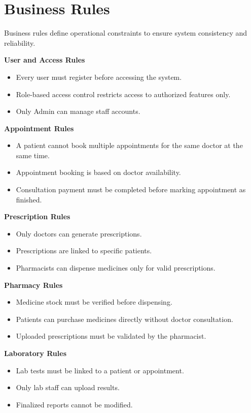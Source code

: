 \section{Business Rules}

Business rules define operational constraints to ensure system consistency and reliability.

\textbf{User and Access Rules}
\begin{itemize}
\item Every user must register before accessing the system.
\item Role-based access control restricts access to authorized features only.
\item Only Admin can manage staff accounts.
\end{itemize}

\textbf{Appointment Rules}
\begin{itemize}
\item A patient cannot book multiple appointments for the same doctor at the same time.
\item Appointment booking is based on doctor availability.
\item Consultation payment must be completed before marking appointment as finished.
\end{itemize}

\textbf{Prescription Rules}
\begin{itemize}
\item Only doctors can generate prescriptions.
\item Prescriptions are linked to specific patients.
\item Pharmacists can dispense medicines only for valid prescriptions.
\end{itemize}

\textbf{Pharmacy Rules}
\begin{itemize}
\item Medicine stock must be verified before dispensing.
\item Patients can purchase medicines directly without doctor consultation.
\item Uploaded prescriptions must be validated by the pharmacist.
\end{itemize}

\textbf{Laboratory Rules}
\begin{itemize}
\item Lab tests must be linked to a patient or appointment.
\item Only lab staff can upload results.
\item Finalized reports cannot be modified.
\end{itemize}

